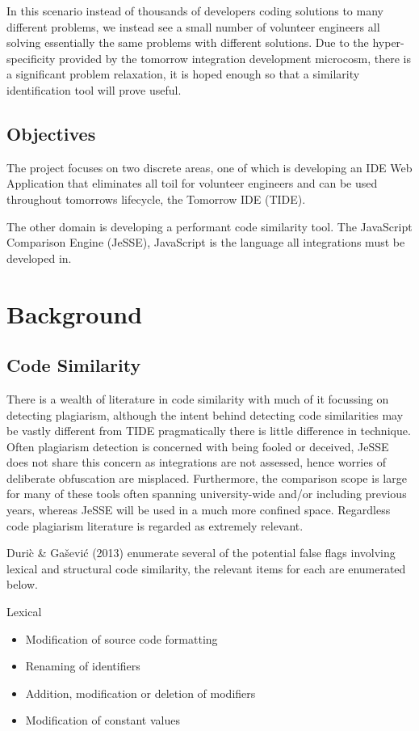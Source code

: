 \documentclass[jou,apacite]{apa6}
\begin{document}
In this scenario instead of thousands of developers coding solutions to many different problems, we instead see a small number of volunteer engineers all solving essentially the same problems with different solutions. Due to the hyper-specificity provided by the tomorrow integration development microcosm, there is a significant problem relaxation, it is hoped enough so that a similarity identification tool will prove useful.

\subsection{Objectives}
The project focuses on two discrete areas, one of which is developing an IDE Web Application that eliminates all toil for volunteer engineers and can be used throughout tomorrow\textquotesingle s lifecycle, the Tomorrow IDE (TIDE).

The other domain is developing a performant code similarity tool. The JavaScript Comparison Engine (JeSSE), JavaScript is the language all integrations must be developed in.

\section{Background}
\subsection{Code Similarity}
There is a wealth of literature in code similarity with much of it focussing on detecting plagiarism, although the intent behind detecting code similarities may be vastly different from TIDE pragmatically there is little difference in technique. Often plagiarism detection is concerned with being fooled or deceived, JeSSE does not share this concern as integrations are not assessed,  hence worries of deliberate obfuscation are misplaced. Furthermore, the comparison scope is large for many of these tools often spanning university-wide and/or including previous years, whereas JeSSE will be used in a much more confined space. Regardless code plagiarism literature is regarded as extremely relevant.

Duri\`c \& Gašević (2013) enumerate several of the potential false flags involving lexical and structural code similarity, the relevant items for each are enumerated below.

Lexical
\begin{itemize}
  \setlength\itemsep{-0.5em}
  \item Modification of source code formatting 
  \item Renaming of identifiers
  \item Addition, modification or deletion of modifiers
  \item Modification of constant values
\end{itemize}
\end{document}
